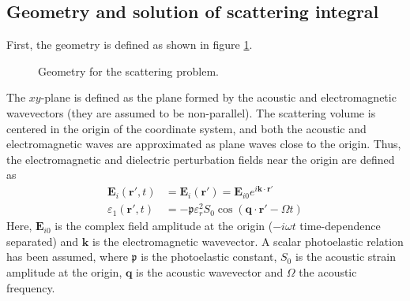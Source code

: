 \documentclass[10pt,a4paper]{eitExjobb}
\begin{document}
	\subsection{Geometry and solution of scattering integral}
	First, the geometry is defined as shown in figure \ref{fig:radareq-geom}.
	\begin{figure}[h]
		\centering
		
		\caption{\label{fig:radareq-geom} Geometry for the scattering problem.}
	\end{figure}
	The $xy$-plane is defined as the plane formed by the acoustic and electromagnetic wavevectors (they are assumed to be non-parallel). The scattering volume is centered in the origin of the coordinate system, and both the acoustic and electromagnetic waves are approximated as plane waves close to the origin. Thus, the electromagnetic and dielectric perturbation fields near the origin are defined as
	\begin{align*}
	\bm{E}_i (\bm{r}',t) &= \bm{E}_i (\bm{r}') = \bm{E}_{i0} e^{i\bm{k}\cdot\bm{r}'} \\
	\varepsilon_1 (\bm{r}',t) &= -\mathfrak{p} \varepsilon_r^2 S_0 \cos(\bm{q} \cdot \bm{r}' - \Omega t)
	\end{align*}
	Here, $\bm{E}_{i0}$ is the complex field amplitude at the origin ($-i\omega t$ time-dependence separated) and $\bm{k}$ is the electromagnetic wavevector. A scalar photoelastic relation has been assumed, where $\mathfrak{p}$ is the photoelastic constant, $S_0$ is the acoustic strain amplitude at the origin, $\bm{q}$ is the acoustic wavevector and $\Omega$ the acoustic frequency.
	
\end{document}
